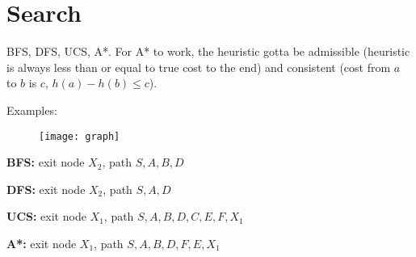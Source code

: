 \section{Search}
BFS, DFS, UCS, A*. For A* to work, the heuristic gotta be admissible (heuristic is always less than or equal to true cost to the end) and consistent (cost from $a$ to $b$ is $c$, $h(a) - h(b) \leq c$).

Examples:

\begin{figure}[H]
    \centering
    \texttt{[image: graph]}
\end{figure}

\textbf{BFS:} exit node $X_2$, path $S, A, B, D$

\textbf{DFS:} exit node $X_2$, path $S, A, D$

\textbf{UCS:} exit node $X_1$, path $S, A, B, D, C, E, F, X_1$

\textbf{A*:} exit node $X_1$, path $S, A, B, D, F, E, X_1$
